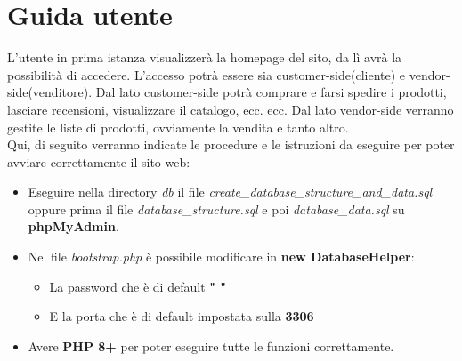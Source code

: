 \documentclass[a4paper,12pt]{report}
\begin{document}
	\section{Guida utente}
	L'utente in prima istanza visualizzerà la homepage del sito, da lì avrà la possibilità di accedere.
	L'accesso potrà essere sia customer-side(cliente) e vendor-side(venditore).
	Dal lato customer-side potrà comprare e farsi spedire i prodotti, lasciare recensioni, visualizzare il catalogo, ecc. ecc.
	Dal lato vendor-side verranno gestite le liste di prodotti, ovviamente la vendita e tanto altro.\\
	
	\textsf{\small Qui, di seguito verranno indicate le procedure e le istruzioni da eseguire per poter avviare correttamente il sito web: } \\
	
	\begin{itemize}
		\item \textsf{\small Eseguire nella directory \emph{db} il file \emph{create\_database\_structure\_and\_data.sql} oppure prima il file \emph{database\_structure.sql} e poi \emph{database\_data.sql} su \textbf{phpMyAdmin}.}
		\item \textsf{\small Nel file \emph{bootstrap.php} è possibile modificare in \textbf{new DatabaseHelper}:}
		\begin{itemize}
			\item \textsf{\small La password che è di default \textbf{" "}}
			\item \textsf{\small E la porta che è di default impostata sulla \textbf{3306}}
		\end{itemize}
		\item \textsf{\small Avere \textbf{PHP 8+} per poter eseguire tutte le funzioni correttamente.}
	\end{itemize}
\end{document}
